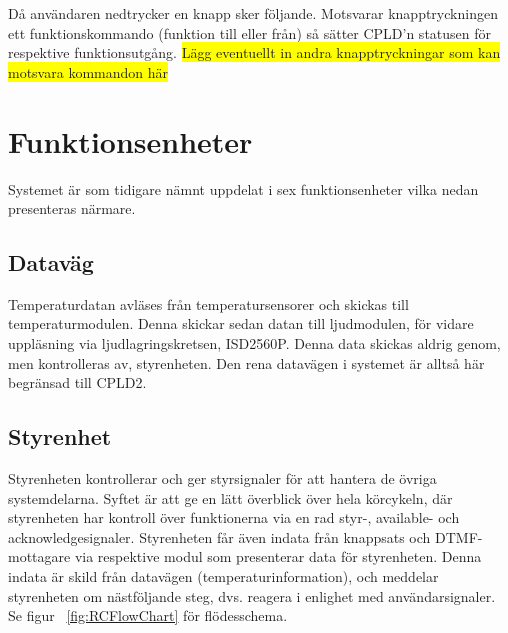 \documentclass[a4paper,11pt]{article}
\begin{document}
Då användaren nedtrycker en knapp sker följande. Motsvarar knapptryckningen ett funktionskommando (funktion till eller från) så sätter CPLD'n statusen för respektive funktionsutgång. \colorbox{yellow}{Lägg eventuellt in andra knapptryckningar som kan motsvara kommandon här}

\section{Funktionsenheter}
\label{sec:Funktionsenheter}
Systemet är som tidigare nämnt uppdelat i sex funktionsenheter vilka nedan presenteras närmare.

	\subsection{Dataväg}
	Temperaturdatan avläses från temperatursensorer och skickas till temperaturmodulen. Denna skickar sedan datan till ljudmodulen, för vidare uppläsning via ljudlagringskretsen, ISD2560P. Denna data skickas aldrig genom, men kontrolleras av, styrenheten. Den rena datavägen i systemet är alltså här begränsad till CPLD2.
	
	\subsection{Styrenhet}

	Styrenheten kontrollerar och ger styrsignaler för att hantera de övriga systemdelarna. Syftet är att ge en lätt överblick över hela körcykeln, där styrenheten har kontroll över funktionerna via en rad styr-, available- och acknowledgesignaler. Styrenheten får även indata från knappsats och DTMF-mottagare via respektive modul som presenterar data för styrenheten. Denna indata är skild från datavägen (temperaturinformation), och meddelar styrenheten om nästföljande steg, dvs. reagera i enlighet med användarsignaler. Se figur ~\ref{fig:RCFlowChart} för flödesschema.
\end{document}
